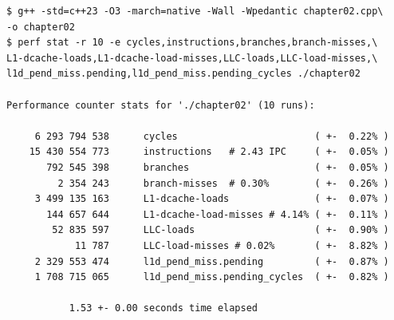 \documentclass[12pt,a4paper,twoside,openright]{book}
\begin{document}
\begin{mdframed}[skipabove=\baselineskip,skipbelow=0pt,hidealllines=true,backgroundcolor=black!3,innerleftmargin=10pt,innerrightmargin=5pt,innertopmargin=0pt,innerbottommargin=5pt]
{\small
\begin{verbatim} 
$ g++ -std=c++23 -O3 -march=native -Wall -Wpedantic chapter02.cpp\
-o chapter02
$ perf stat -r 10 -e cycles,instructions,branches,branch-misses,\
L1-dcache-loads,L1-dcache-load-misses,LLC-loads,LLC-load-misses,\
l1d_pend_miss.pending,l1d_pend_miss.pending_cycles ./chapter02

Performance counter stats for './chapter02' (10 runs):

     6 293 794 538      cycles                        ( +-  0.22% )
    15 430 554 773      instructions   # 2.43 IPC     ( +-  0.05% )
       792 545 398      branches                      ( +-  0.05% )
         2 354 243      branch-misses  # 0.30%        ( +-  0.26% )
     3 499 135 163      L1-dcache-loads               ( +-  0.07% )
       144 657 644      L1-dcache-load-misses # 4.14% ( +-  0.11% )
        52 835 597      LLC-loads                     ( +-  0.90% )
            11 787      LLC-load-misses # 0.02%       ( +-  8.82% )
     2 329 553 474      l1d_pend_miss.pending         ( +-  0.87% )
     1 708 715 065      l1d_pend_miss.pending_cycles  ( +-  0.82% )

           1.53 +- 0.00 seconds time elapsed
\end{verbatim}
}
\end{mdframed}
\begin{mdframed}[skipabove=0pt,skipbelow=\baselineskip,hidealllines=true,innerleftmargin=10pt,innerrightmargin=5pt,innertopmargin=3pt,innerbottommargin=3pt]
\label{lst:perf_chapter02_3}
\end{mdframed}

\end{document}
